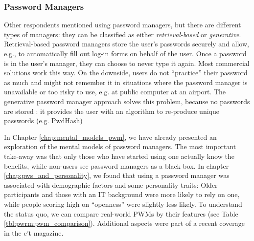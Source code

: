 \subsubsection{Password Managers} 
Other respondents mentioned using password managers, but there are different types of managers: they can be classified as either \textit{retrieval-based} or \textit{generative}. Retrieval-based password managers store the user's passwords securely and allow, e.g., to automatically fill out log-in forms on behalf of the user. Once a password is in the user's manager, they can choose to never type it again. Most commercial solutions work this way. On the downside, users do not ``practice'' their password as much and might not remember it in situations where the password manager is unavailable or too risky to use, e.g. at public computer at an airport. The generative password manager approach solves this problem, because no passwords are stored \cite{McCarney2012Tapas}: it provides the user with an algorithm to re-produce unique passwords (e.g. PwdHash)  %

%
%


In Chapter \ref{chap:mental_models_pwm}, we have already presented an exploration of the mental models of password managers. The most important take-away was that only those who have started using one actually know the benefits, while non-users see password managers as a black box. In chapter \ref{chap:pws_and_personality}, we found that using a password manager was associated with demographic factors and some personality traits: Older participants and those with an IT background were more likely to rely on one, while people scoring high on ``openness'' were slightly less likely. To understand the status quo, we can compare real-world PWMs by their features (see Table \ref{tbl:pwrm:pwm_comparison}). Additional aspects were part of a recent coverage in the c't magazine. 


